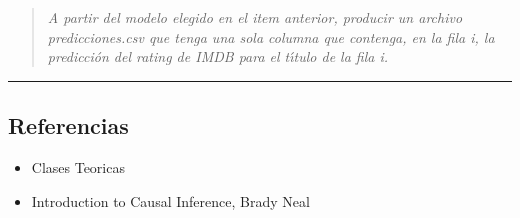 \documentclass[
]{article}
\providecommand{\tightlist}{%
  \setlength{\itemsep}{0pt}\setlength{\parskip}{0pt}}
\begin{document}
\begin{quote}
\emph{A partir del modelo elegido en el item anterior, producir un
archivo predicciones.csv que tenga una sola columna que contenga, en la
fila i, la predicción del rating de IMDB para el tı́tulo de la fila i.}
\end{quote}

\begin{center}\rule{0.5\linewidth}{0.5pt}\end{center}

\subsection{Referencias}\label{referencias}

\begin{itemize}
\tightlist
\item
  Clases Teoricas\\
\item
  Introduction to Causal Inference, Brady Neal
\end{itemize}
\end{document}
